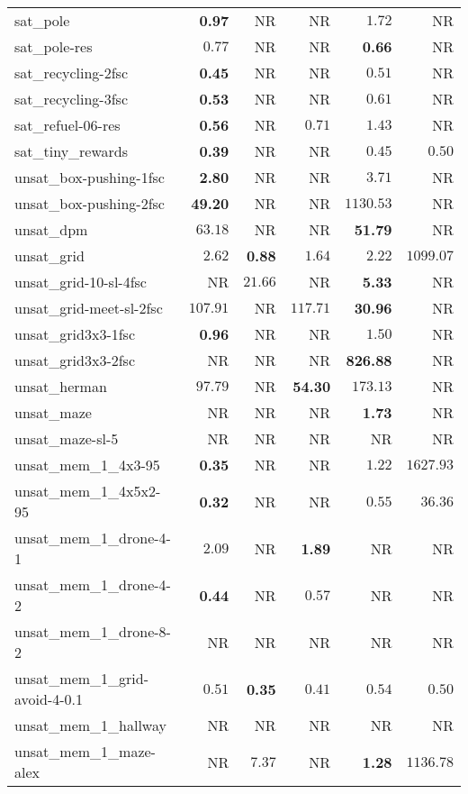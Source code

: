 \begin{tabular}{lrrrrr}
sat\_pole & \textbf{0.97} & NR & NR & $1.72$ & NR \\
sat\_pole-res & $0.77$ & NR & NR & \textbf{0.66} & NR \\
sat\_recycling-2fsc & \textbf{0.45} & NR & NR & $0.51$ & NR \\
sat\_recycling-3fsc & \textbf{0.53} & NR & NR & $0.61$ & NR \\
sat\_refuel-06-res & \textbf{0.56} & NR & $0.71$ & $1.43$ & NR \\
sat\_tiny\_rewards & \textbf{0.39} & NR & NR & $0.45$ & $0.50$ \\
unsat\_box-pushing-1fsc & \textbf{2.80} & NR & NR & $3.71$ & NR \\
unsat\_box-pushing-2fsc & \textbf{49.20} & NR & NR & $1130.53$ & NR \\
unsat\_dpm & $63.18$ & NR & NR & \textbf{51.79} & NR \\
unsat\_grid & $2.62$ & \textbf{0.88} & $1.64$ & $2.22$ & $1099.07$ \\
unsat\_grid-10-sl-4fsc & NR & $21.66$ & NR & \textbf{5.33} & NR \\
unsat\_grid-meet-sl-2fsc & $107.91$ & NR & $117.71$ & \textbf{30.96} & NR \\
unsat\_grid3x3-1fsc & \textbf{0.96} & NR & NR & $1.50$ & NR \\
unsat\_grid3x3-2fsc & NR & NR & NR & \textbf{826.88} & NR \\
unsat\_herman & $97.79$ & NR & \textbf{54.30} & $173.13$ & NR \\
unsat\_maze & NR & NR & NR & \textbf{1.73} & NR \\
unsat\_maze-sl-5 & NR & NR & NR & NR & NR \\
unsat\_mem\_1\_4x3-95 & \textbf{0.35} & NR & NR & $1.22$ & $1627.93$ \\
unsat\_mem\_1\_4x5x2-95 & \textbf{0.32} & NR & NR & $0.55$ & $36.36$ \\
unsat\_mem\_1\_drone-4-1 & $2.09$ & NR & \textbf{1.89} & NR & NR \\
unsat\_mem\_1\_drone-4-2 & \textbf{0.44} & NR & $0.57$ & NR & NR \\
unsat\_mem\_1\_drone-8-2 & NR & NR & NR & NR & NR \\
unsat\_mem\_1\_grid-avoid-4-0.1 & $0.51$ & \textbf{0.35} & $0.41$ & $0.54$ & $0.50$ \\
unsat\_mem\_1\_hallway & NR & NR & NR & NR & NR \\
unsat\_mem\_1\_maze-alex & NR & $7.37$ & NR & \textbf{1.28} & $1136.78$ \\

\end{tabular}
